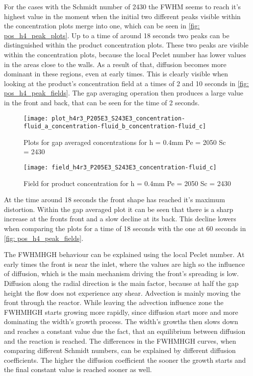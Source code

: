 \documentclass[../thesis.tex]{subfiles}
\begin{document}
For the cases with the Schmidt number of 2430 the FWHM seems to reach it's highest value in the moment when the initial two different peaks visible within the concentration plots merge into one, which can be seen in \autoref{fig: pos_h4_peak_plots}. Up to a time of around 18 seconds two peaks can be distinguished within the product concentration plots. These two peaks are visible within the concentration plots, because the local Peclet number has lower values in the areas close to the walls. As a result of that, diffusion becomes more dominant in these regions, even at early times. This is clearly visible when looking at the product's concentration field at a times of 2 and 10 seconds in \autoref{fig: pos_h4_peak_fields}. The gap averaging operation then produces a large value in the front and back, that can be seen for the time of 2 seconds.

\begin{figure}[htbp]
	\centering
	\texttt{[image: plot\_h4r3\_P205E3\_S243E3\_concentration-fluid\_a\_concentration-fluid\_b\_concentration-fluid\_c]}
	\caption{Plots for gap averaged concentrations for h = 0.4mm Pe = 2050 Sc = 2430}
	\label{fig: pos_h4_peak_plots}
\end{figure}
\begin{figure}[htbp]
	\centering
	\texttt{[image: field\_h4r3\_P205E3\_S243E3\_concentration-fluid\_c]}
	\caption{Field for product concentration for h = 0.4mm Pe = 2050 Sc = 2430}
	\label{fig: pos_h4_peak_fields}
\end{figure}

At the time around 18 seconds the front shape has reached it's maximum distortion. Within the gap averaged plot it can be seen that there is a sharp increase at the fronts front and a slow decline at its back. This decline lowers when comparing the plots for a time of 18 seconds with the one at 60 seconds in \autoref{fig: pos_h4_peak_fields}.

The FWHMHGH behaviour can be explained using the local Peclet number. At early times the front is near the inlet, where the values are high so the influence of diffusion, which is the main mechanism driving the front's spreading is low. Diffusion along the radial direction is the main factor, because at half the gap height the flow does not experience any shear. Advection is mainly moving the front through the reactor. While leaving the advection influence zone the FWHMHGH starts growing more rapidly, since diffusion start more and more dominating the width's growth process. The width's growths then slows down and reaches a constant value due the fact, that an equilibrium between diffusion and the reaction is reached. The differences in the FWHMHGH curves, when comparing different Schmidt numbers, can be explained by different diffusion coefficients. The higher the diffusion coefficient the sooner the growth starts and the final constant value is reached sooner as well.
\newpage
\end{document}
